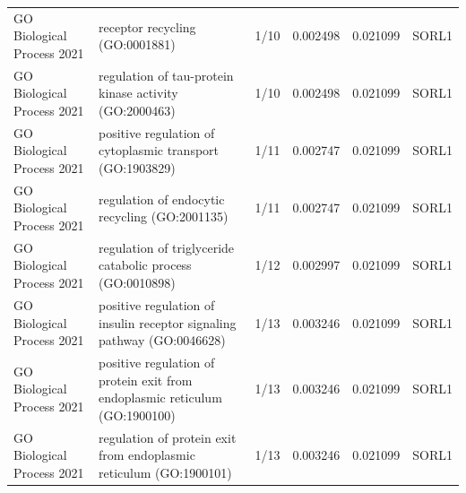 \documentclass{article}
\begin{document}
\begin{table}[H]
{\begin{tabular}{@{}llcccc@{}}
              GO Biological Process 2021 & receptor recycling (GO:0001881) & 1/10 & 0.002498 & 0.021099 & SORL1 \\
              GO Biological Process 2021 & regulation of tau-protein kinase activity (GO:2000463) & 1/10 & 0.002498 & 0.021099 & SORL1 \\
              GO Biological Process 2021 & positive regulation of cytoplasmic transport (GO:1903829) & 1/11 & 0.002747 & 0.021099 & SORL1 \\
              GO Biological Process 2021 & regulation of endocytic recycling (GO:2001135) & 1/11 & 0.002747 & 0.021099 & SORL1 \\
              GO Biological Process 2021 & regulation of triglyceride catabolic process (GO:0010898) & 1/12 & 0.002997 & 0.021099 & SORL1 \\
              GO Biological Process 2021 & positive regulation of insulin receptor signaling pathway (GO:0046628) & 1/13 & 0.003246 & 0.021099 & SORL1 \\
              GO Biological Process 2021 & positive regulation of protein exit from endoplasmic reticulum (GO:1900100) & 1/13 & 0.003246 & 0.021099 & SORL1 \\
              GO Biological Process 2021 & regulation of protein exit from endoplasmic reticulum (GO:1900101) & 1/13 & 0.003246 & 0.021099 & SORL1 \\ \bottomrule
            \end{tabular}
          }

        \end{table}
\end{document}

